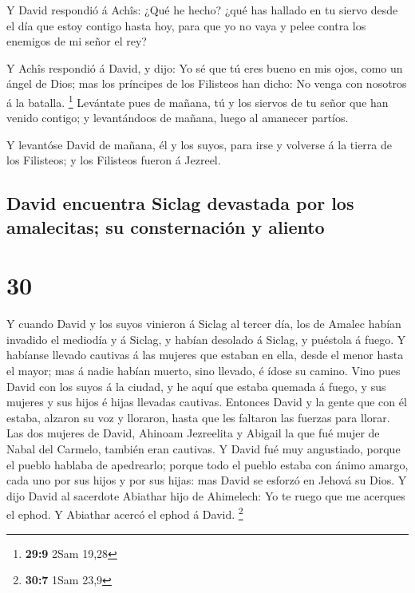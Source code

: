  Y David respondió á Achîs: ¿Qué he hecho? ¿qué has hallado
en tu siervo desde el día que estoy contigo hasta hoy, para que yo no
vaya y pelee contra los enemigos de mi señor el rey?

 Y Achîs respondió á David, y dijo: Yo sé que tú eres bueno
en mis ojos, como un ángel de Dios; mas los príncipes de los Filisteos
han dicho: No venga con nosotros á la batalla. \footnote{\textbf{29:9}
  2Sam 19,28}  Levántate pues de mañana, tú y los siervos
de tu señor que han venido contigo; y levantándoos de mañana, luego al
amanecer partíos.

 Y levantóse David de mañana, él y los suyos, para irse y
volverse á la tierra de los Filisteos; y los Filisteos fueron á Jezreel.

\hypertarget{david-encuentra-siclag-devastada-por-los-amalecitas-su-consternaciuxf3n-y-aliento}{%
\subsection{David encuentra Siclag devastada por los amalecitas; su
consternación y
aliento}\label{david-encuentra-siclag-devastada-por-los-amalecitas-su-consternaciuxf3n-y-aliento}}

\hypertarget{section-29}{%
\section{30}\label{section-29}}

 Y cuando David y los suyos vinieron á Siclag al tercer día,
los de Amalec habían invadido el mediodía y á Siclag, y habían desolado
á Siclag, y puéstola á fuego.  Y habíanse llevado cautivas á
las mujeres que estaban en ella, desde el menor hasta el mayor; mas á
nadie habían muerto, sino llevado, é ídose su camino.  Vino
pues David con los suyos á la ciudad, y he aquí que estaba quemada á
fuego, y sus mujeres y sus hijos é hijas llevadas cautivas. 
Entonces David y la gente que con él estaba, alzaron su voz y lloraron,
hasta que les faltaron las fuerzas para llorar.  Las dos
mujeres de David, Ahinoam Jezreelita y Abigail la que fué mujer de Nabal
del Carmelo, también eran cautivas.  Y David fué muy
angustiado, porque el pueblo hablaba de apedrearlo; porque todo el
pueblo estaba con ánimo amargo, cada uno por sus hijos y por sus hijas:
mas David se esforzó en Jehová su Dios.  Y dijo David al
sacerdote Abiathar hijo de Ahimelech: Yo te ruego que me acerques el
ephod. Y Abiathar acercó el ephod á David. \footnote{\textbf{30:7} 1Sam
  23,9}

